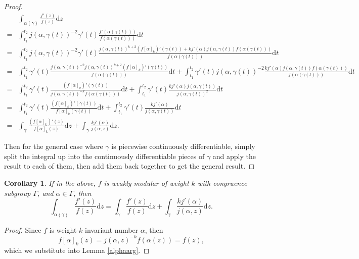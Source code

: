 \documentclass{article}
\newtheorem{cor}{Corollary}[section]
\theoremstyle{definition}
\theoremstyle{definition}
\theoremstyle{definition}
\begin{document}
\begin{proof}
{\tiny{\begin{align}
  & \int_{\alpha (\gamma)} \frac{f' (z)}{f (z)} \mathrm{d} z \nonumber\\
  = & \int_{t_1}^{t_2} j (\alpha, \gamma (t))^{- 2} \gamma' (t)  \frac{f' (\alpha
  (\gamma (t)))}{f (\alpha (\gamma (t)))} \mathrm{d} t \nonumber\\
  = & \int_{t_1}^{t_2} j (\alpha, \gamma (t))^{- 2} \gamma' (t)  \frac{j (\alpha,
  \gamma (t))^{k + 2}  (f [\alpha]_k)' (\gamma (t)) + kj' (\alpha) j (\alpha,
  \gamma (t)) f (\alpha (\gamma (t)))}{f (\alpha (\gamma (t)))} \mathrm{d} t
  \nonumber\\
  = & \int_{t_1}^{t_2} \gamma' (t)  \frac{j (\alpha, \gamma (t))^{- 2} j (\alpha,
  \gamma (t))^{k + 2}  (f [\alpha]_k)' (\gamma (t))}{f (\alpha (\gamma (t)))}
  \mathrm{d} t + \int_{t_1}^{t_2} \gamma' (t) j (\alpha, \gamma (t))^{- 2}  \frac{kj'
  (\alpha) j (\alpha, \gamma (t)) f (\alpha (\gamma (t)))}{f (\alpha (\gamma
  (t)))} \mathrm{d} t \nonumber\\
  = & \int_{t_1}^{t_2} \gamma' (t)  \frac{(f [\alpha]_k)' (\gamma (t))}{j (\alpha,
  \gamma (t))^{- k} f (\alpha (\gamma (t)))} \mathrm{d} t + \int_{t_1}^{t_2} \gamma' (t) 
  \frac{kj' (\alpha) j (\alpha, \gamma (t))}{j (\alpha, \gamma (t))^2} \mathrm{d}
  t \nonumber\\
  = & \int_{t_1}^{t_2} \gamma' (t)  \frac{(f [\alpha]_k)' (\gamma (t))}{f [\alpha]_k
  (\gamma (t))} \mathrm{d} t + \int_{t_1}^{t_2} \gamma' (t)  \frac{kj' (\alpha)}{j
  (\alpha, \gamma (t))} \mathrm{d} t \nonumber\\
  = & \int_{\gamma} \frac{(f [\alpha]_k)' (z)}{f [\alpha]_k (z)} \mathrm{d} z +
  \int_{\gamma} \frac{kj' (\alpha)}{j (\alpha, z)} \mathrm{d} z. \nonumber
\end{align}}}

Then for the general case where $\gamma$ is piecewise continuously differentiable, simply split the integral up into the continuously differentiable pieces of $\gamma$ and apply the result to each of them, then add them back together to get the general result.
\end{proof}

\begin{cor}
    If in the above, $f$ is weakly modular of weight $k$ with congruence subgroup $\Gamma$, and $\alpha\in\Gamma$, then
    $$\int_{\alpha(\gamma)}\frac{f'(z)}{f(z)}\mathrm dz=\int_{\gamma} \frac{f' (z)}{f (z)} \mathrm{d} z + \int_{\gamma} \frac{kj' (\alpha)}{j (\alpha, z)} \mathrm{d} z.$$
\end{cor}
\begin{proof}
    Since $f$ is weight-$k$ invariant number $\alpha$, then
    $$f[\alpha]_k(z)=j(\alpha,z)^{-k}f(\alpha(z))=f(z),$$ 
     which we substitute into Lemma \ref{alphaarg}.
\end{proof}
\end{document}
